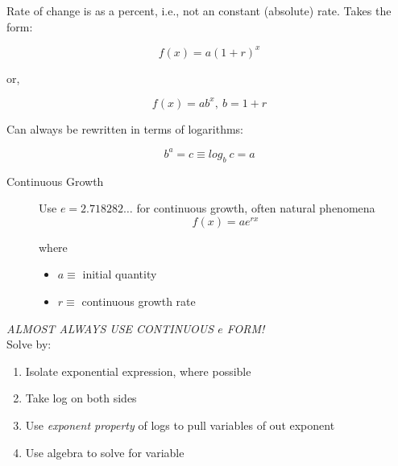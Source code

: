 
Rate of change is as a percent, i.e., not an constant (absolute) rate. Takes the form:

\begin{equation}
    f(x) = a(1 + r)^x
\end{equation}

or, 

\begin{equation}
    f(x) = ab^x,~ b = 1 + r
\end{equation}

Can always be rewritten in terms of logarithms:

\begin{equation}
    b^a = c \equiv log_b~ c = a
\end{equation}

\begin{description}
    \item[Continuous Growth] Use $e = 2.718282\dots$ for continuous growth, often natural phenomena
        \begin{equation}
            f(x) = ae^{rx}
        \end{equation}
        
        where
        
        \begin{itemize}
            \item $a \equiv$ initial quantity
            \item $r \equiv$ continuous growth rate
        \end{itemize}
\end{description}

\textit{ALMOST ALWAYS USE CONTINUOUS $e$ FORM!}\\

Solve by:

\begin{enumerate}
    \item Isolate exponential expression, where possible
    \item Take log on both sides
    \item Use \textit{exponent property} of logs to pull variables of out exponent
    \item Use algebra to solve for variable
\end{enumerate}
\hformbar




